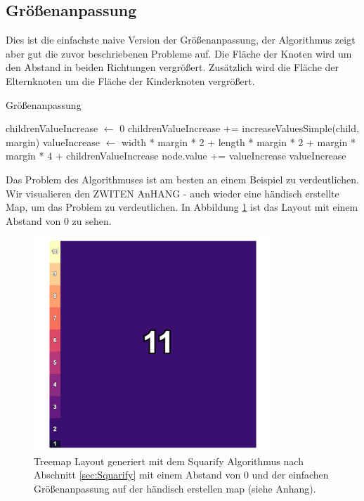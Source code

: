 \subsection{Größenanpassung}
Dies ist die einfachste naive Version der Größenanpassung, der Algorithmus zeigt aber gut die zuvor beschriebenen Probleme auf. Die Fläche der Knoten wird um den Abstand in beiden Richtungen vergrößert. Zusätzlich wird die Fläche der Elternknoten um die Fläche der Kinderknoten vergrößert. 

\begin{algorithm}[H]
\caption{Größenanpassung}
\label{alg:EinfacheGrößenanpassung}
\begin{algorithmic}[1]
    \State childrenValueIncrease $\gets$ 0
            \State childrenValueIncrease += increaseValuesSimple(child, margin)
        \EndFor
    \EndIf
    \State valueIncrease $\gets$ width * margin * 2 + length * margin * 2 + margin * margin * 4 + childrenValueIncrease
    \State node.value += valueIncrease
    \State \Return valueIncrease
\EndFunction
\end{algorithmic}
\end{algorithm}

Das Problem des Algorithmuses ist am besten an einem Beispiel zu verdeutlichen. Wir visualieren den ZWITEN AnHANG - auch wieder eine händisch erstellte Map, um das Problem zu verdeutlichen. In Abbildung \ref{fig:zeroMarginSquarifyArtifialTwo} ist das Layout mit einem Abstand von 0 zu sehen. 

\begin{figure}
    \centering
    \includegraphics[width=0.8\textwidth]{images/zeroMarginSquarifyArtifialTwo.png}
    \caption{Treemap Layout generiert mit dem Squarify Algorithmus nach Abschnitt \ref{sec:Squarify} mit einem Abstand von 0 und der einfachen Größenanpassung auf der händisch erstellen map (siehe Anhang).}
    \label{fig:zeroMarginSquarifyArtifialTwo}
\end{figure}

